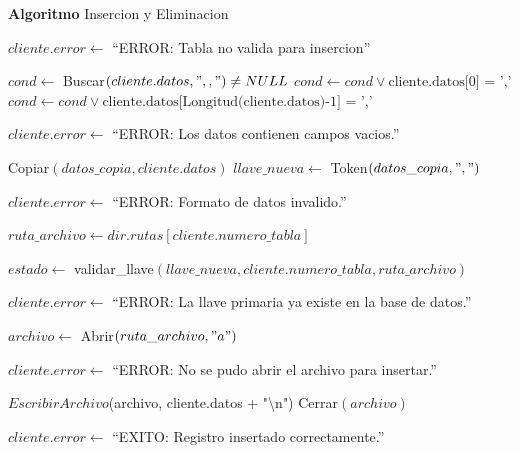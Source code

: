 \begin{tcolorbox}[colback=white, colframe=azul_unam, 
title=Pseudocódigo: insercion.c, breakable]

\textbf{Algoritmo} Insercion y Eliminacion

\begin{algorithmic}[1]



    \State $cliente.error \gets$ ``ERROR: Tabla no valida para insercion''
    \State \Return
\EndIf

\State $cond \gets$ Buscar$(cliente.datos, ",,") \neq NULL$
\State $cond \gets cond \lor \text{cliente.datos[0] = ','}$
\State $cond \gets cond \lor \text{cliente.datos[Longitud(cliente.datos)-1] = ','}$

    \State $cliente.error \gets$ ``ERROR: Los datos contienen campos vacios.''
    \State \Return
\EndIf

\State Copiar$(datos\_copia, cliente.datos)$
\State $llave\_nueva \gets$ Token$(datos\_copia, ",")$

    \State $cliente.error \gets$ ``ERROR: Formato de datos invalido.''
    \State \Return
\EndIf

\State $ruta\_archivo \gets dir.rutas[cliente.numero\_tabla]$

\State $estado \gets$ validar\_llave$(llave\_nueva, cliente.numero\_tabla, ruta\_archivo)$

    \State $cliente.error \gets$ ``ERROR: La llave primaria ya existe en la base de datos.''
    \State \Return
\EndIf

\State $archivo \gets$ Abrir$(ruta\_archivo, "a")$

    \State $cliente.error \gets$ ``ERROR: No se pudo abrir el archivo para insertar.''
    \State \Return
\EndIf

\State $EscribirArchivo$(archivo, cliente.datos + "\textbackslash n")
\State Cerrar$(archivo)$

\State $cliente.error \gets$ ``EXITO: Registro insertado correctamente.''

\EndProcedure

\vspace{0.3cm}


\end{algorithmic}
\end{tcolorbox}
